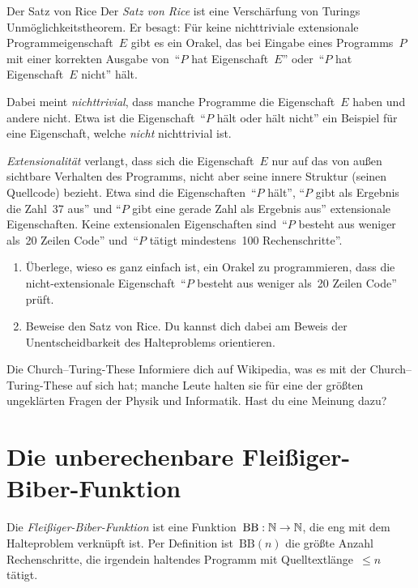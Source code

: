 \documentclass[twoside]{../zirkelblatt1415}
\theoremstyle{definition}
\theoremstyle{plain}
\theoremstyle{remark}
\newcommand{\BB}{\mathrm{BB}}
\begin{document}
\begin{aufgabe}{Der Satz von Rice}
Der \emph{Satz von Rice} ist eine Verschärfung von Turings
Unmöglichkeitstheorem. Er besagt: Für keine nichttriviale extensionale
Programmeigenschaft~$E$ gibt es ein Orakel, das bei Eingabe
eines Programms~$P$ mit einer korrekten Ausgabe von~"`$P$ hat Eigenschaft~$E$"'
oder~"`$P$ hat Eigenschaft~$E$ nicht"' hält.

Dabei meint \emph{nichttrivial}, dass manche Programme die Eigenschaft~$E$
haben und andere nicht. Etwa ist die Eigenschaft~"`$P$ hält oder hält nicht"'
ein Beispiel für eine Eigenschaft, welche \emph{nicht} nichttrivial ist.

\emph{Extensionalität} verlangt, dass sich die Eigenschaft~$E$ nur auf das von
außen sichtbare Verhalten des Programms, nicht aber seine innere Struktur
(seinen Quellcode) bezieht. Etwa sind die Eigenschaften~"`$P$ hält"',
"`$P$ gibt als Ergebnis die Zahl~37 aus"' und "`$P$ gibt eine gerade Zahl als
Ergebnis aus"' extensionale Eigenschaften. Keine extensionalen Eigenschaften
sind~"`$P$ besteht aus weniger als~20 Zeilen Code"' und~"`$P$ tätigt
mindestens~100 Rechenschritte"'.

\begin{enumerate}
\item Überlege, wieso es ganz einfach ist, ein Orakel zu programmieren, dass
die nicht-extensionale Eigenschaft~"`$P$ besteht aus weniger als~20 Zeilen
Code"' prüft.
\item Beweise den Satz von Rice. Du kannst dich dabei am Beweis der
Unentscheidbarkeit des Halteproblems orientieren.
\end{enumerate}\fixlistspacing
\end{aufgabe}

\begin{aufgabe}{Die Church--Turing-These}
Informiere dich auf Wikipedia, was es mit der Church--Turing-These auf sich
hat; manche Leute halten sie für eine der größten ungeklärten Fragen der Physik
und Informatik. Hast du eine Meinung dazu?
\end{aufgabe}


\section{Die unberechenbare Fleißiger-Biber-Funktion}

Die \emph{Fleißiger-Biber-Funktion} ist eine Funktion~$\BB : \NN \to \NN$, die
eng mit dem Halteproblem verknüpft ist. Per Definition ist~$\BB(n)$ die größte
Anzahl Rechenschritte, die irgendein haltendes Programm mit
Quelltextlänge~$\leq n$ tätigt.
\end{document}
